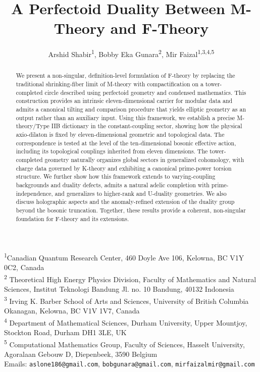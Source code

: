 \documentclass[11pt]{article}
\title{\bf A Perfectoid Duality Between M-Theory and F-Theory}
\author{
Arshid Shabir\textsuperscript{1}, Bobby Eka Gunara\textsuperscript{2}, 
Mir Faizal\textsuperscript{1,3,4,5}
}
\date{}
\theoremstyle{remark}
\begin{document}
\maketitle
\begin{center}
\textsuperscript{1}Canadian Quantum Research Center, 460 Doyle Ave 106, Kelowna, BC V1Y 0C2, Canada\\
\textsuperscript{2} Theoretical High Energy Physics Division, Faculty of Mathematics and Natural Sciences, Institut Teknologi Bandung Jl. no. 10 Bandung, 40132 Indonesia\\
\textsuperscript{3} Irving K. Barber School of Arts and Sciences, University of British Columbia Okanagan, Kelowna, BC V1V 1V7, Canada\\
\textsuperscript{4} Department of Mathematical Sciences, Durham University, Upper Mountjoy, Stockton Road, Durham DH1 3LE, UK\\
\textsuperscript{5} Computational Mathematics Group, Faculty of Sciences, Hasselt University, Agoralaan Gebouw D, Diepenbeek, 3590 Belgium\\
Emails: \texttt{aslone186@gmail.com},  \texttt{bobgunara@gmail.com},  \texttt{mirfaizalmir@gmail.com}
\end{center}
\thispagestyle{empty}

\begin{abstract}
We present a non-singular, definition-level formulation of F-theory by replacing the traditional shrinking-fiber limit of M-theory with compactification on a tower-completed circle described using perfectoid geometry and condensed mathematics. This construction provides an intrinsic eleven-dimensional carrier for modular data and admits a canonical tilting and comparison procedure that yields elliptic geometry as an output rather than an auxiliary input. Using this framework, we establish a precise M-theory/Type IIB dictionary in the constant-coupling sector, showing how the physical axio-dilaton is fixed by eleven-dimensional geometric and topological data. The correspondence is tested at the level of the ten-dimensional bosonic effective action, including its topological couplings inherited from eleven dimensions. The tower-completed geometry naturally organizes global sectors in generalized cohomology, with charge data governed by K-theory and exhibiting a canonical prime-power torsion structure. We further show how this framework extends to varying-coupling backgrounds and duality defects, admits a natural adelic completion with prime-independence, and generalizes to higher-rank and U-duality geometries. We also discuss holographic aspects and the anomaly-refined extension of the duality group beyond the bosonic truncation. Together, these results provide a coherent, non-singular foundation for F-theory and its extensions.
\end{abstract}
\end{document}
